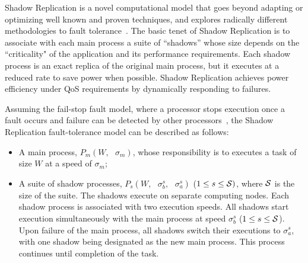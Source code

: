 
Shadow Replication is a novel computational model that goes beyond adapting or optimizing well known and proven techniques, and explores radically different methodologies to fault tolerance~\cite{mills_2014_icnc,mills_2014_pdp,mills2014power}. %
The basic tenet of Shadow Replication is to associate with each main process a suite of “shadows” whose size depends on the 
``criticality" of the application and its performance requirements. Each shadow process is an exact replica of the original 
main process, but it executes at a reduced rate to save power when possible.
Shadow Replication achieves power efficiency under QoS requirements by dynamically responding to failures. 

Assuming the fail-stop fault model, where a processor stops execution once a fault
occurs and failure can be detected by other processors~\cite{gartner_faults_1999,cristian_comm_1991}, 
the Shadow Replication fault-tolerance model can be described as follows:
\begin{itemize}
	\item A main process, $P_m(W,\text{ }\sigma_m)$, whose responsibility is to executes a task of size $W$ at a speed of $\sigma_m$;
	\item A suite of shadow processes, $P_{s}(W,\text{ }\sigma_b^s, \text{ }\sigma_a^s)$ ($1 \le s \le \cal S)$, where $\cal S$ is the size of the suite. The shadows execute on separate computing nodes. Each shadow process is associated with two execution speeds. All shadows start execution simultaneously with the main process at speed $\sigma_b^s$ ($1 \le s \le \cal S$). Upon failure of the main process, all shadows switch their executions to $\sigma_a^s$, with one shadow being designated as the new main process. This process continues until completion of the task.
\end{itemize}

